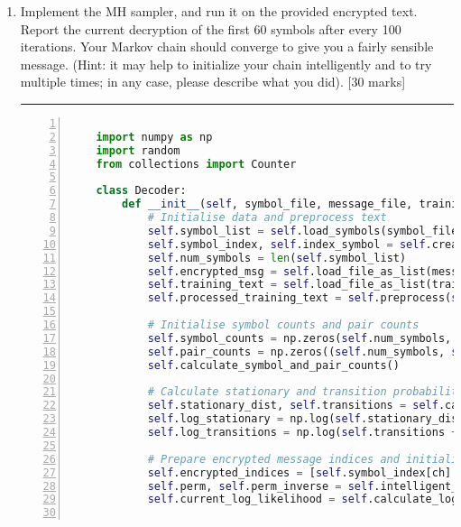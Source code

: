 \documentclass{article}
\begin{document}
\begin{enumerate}
    \item[(d)] Implement the MH sampler, and run it on the provided encrypted text. Report the current decryption of the first 60 symbols after every 100 iterations. Your Markov chain should converge to give you a fairly sensible message. (Hint: it may help to initialize your chain intelligently and to try multiple times; in any case, please describe what you did). [30 marks]

    \noindent\textcolor{gray}{\rule{0.1\linewidth}{0.4pt}}
    \vspace{10pt}

    \begin{lstlisting}[language=Python, numbers=left, frame=single, breaklines=true, basicstyle=\small]

    import numpy as np
    import random
    from collections import Counter
    
    class Decoder:
        def __init__(self, symbol_file, message_file, training_file):
            # Initialise data and preprocess text
            self.symbol_list = self.load_symbols(symbol_file)
            self.symbol_index, self.index_symbol = self.create_symbol_mappings()
            self.num_symbols = len(self.symbol_list)
            self.encrypted_msg = self.load_file_as_list(message_file)
            self.training_text = self.load_file_as_list(training_file)
            self.processed_training_text = self.preprocess(self.training_text)
            
            # Initialise symbol counts and pair counts
            self.symbol_counts = np.zeros(self.num_symbols, dtype=int)
            self.pair_counts = np.zeros((self.num_symbols, self.num_symbols), dtype=int)
            self.calculate_symbol_and_pair_counts()
            
            # Calculate stationary and transition probabilities
            self.stationary_dist, self.transitions = self.calculate_probabilities()
            self.log_stationary = np.log(self.stationary_dist + 1e-10)
            self.log_transitions = np.log(self.transitions + 1e-10)
            
            # Prepare encrypted message indices and initialise permutation
            self.encrypted_indices = [self.symbol_index[ch] for ch in self.encrypted_msg if ch in self.symbol_index]
            self.perm, self.perm_inverse = self.intelligent_initialisation()
            self.current_log_likelihood = self.calculate_log_likelihood([self.perm_inverse[idx] for idx in self.encrypted_indices])
    

\end{lstlisting}
\end{enumerate}
\end{document}

